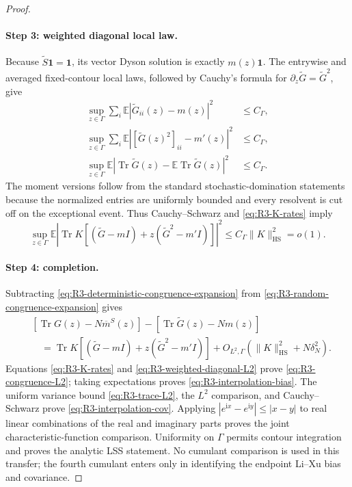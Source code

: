 \documentclass[10pt,a4paper]{amsart}
\newcommand{\E}{\mathbb E}
\newcommand{\Tr}{\operatorname{Tr}}
\newcommand{\ii}{\mathrm i}
\newcommand{\HS}{\mathrm{HS}}
\newcommand{\one}{\mathbf 1}
\newcommand{\norm}[1]{\lVert #1\rVert}
\begin{document}
\begin{proof}
\paragraph{Step 3: weighted diagonal local law.}
Because \(\widetilde S\one=\one\), its vector Dyson solution is exactly
\(m(z)\one\).  The entrywise and averaged fixed-contour local laws, followed
by Cauchy's formula for \(\partial_z\widetilde G=\widetilde G^2\), give
\begin{align}
 \sup_{z\in\Gamma}\sum_i
 \E|\widetilde G_{ii}(z)-m(z)|^2&\le C_\Gamma,
 \label{eq:R3-diagonal-L2-G}\\
 \sup_{z\in\Gamma}\sum_i
 \E|[\widetilde G(z)^2]_{ii}-m'(z)|^2&\le C_\Gamma,
 \label{eq:R3-diagonal-L2-G2}\\
 \sup_{z\in\Gamma}\E|\Tr\widetilde G(z)
 -\E\Tr\widetilde G(z)|^2&\le C_\Gamma.
 \label{eq:R3-trace-L2}
\end{align}
The moment versions follow from the standard stochastic-domination statements
because the normalized entries are uniformly bounded and every resolvent is
cut off on the exceptional event.  Thus Cauchy--Schwarz and
\eqref{eq:R3-K-rates} imply
\begin{equation}\label{eq:R3-weighted-diagonal-L2}
 \sup_{z\in\Gamma}\E\left|
 \Tr K\left[(\widetilde G-mI)
 +z(\widetilde G^2-m'I)\right]\right|^2
 \le C_\Gamma\norm{K}_{\HS}^2=o(1).
\end{equation}

\paragraph{Step 4: completion.}
Subtracting \eqref{eq:R3-deterministic-congruence-expansion} from
\eqref{eq:R3-random-congruence-expansion} gives
\begin{align}
 &\left[\Tr G(z)-N\overline m^S(z)\right]
 -\left[\Tr\widetilde G(z)-Nm(z)\right]\nonumber\\
 &\quad=\Tr K\left[(\widetilde G-mI)
 +z(\widetilde G^2-m'I)\right]
 +O_{L^2,\Gamma}(\norm{K}_{\HS}^2+N\delta_N^2).
 \label{eq:R3-master-congruence-transfer}
\end{align}
Equations \eqref{eq:R3-K-rates} and
\eqref{eq:R3-weighted-diagonal-L2} prove
\eqref{eq:R3-congruence-L2}; taking expectations proves
\eqref{eq:R3-interpolation-bias}.  The uniform variance bound
\eqref{eq:R3-trace-L2}, the \(L^2\) comparison, and Cauchy--Schwarz prove
\eqref{eq:R3-interpolation-cov}.  Applying
$|e^{\ii x}-e^{\ii y}|\le|x-y|$ to real linear combinations of the real and
imaginary parts proves the joint characteristic-function comparison.
Uniformity on \(\Gamma\) permits contour integration and proves the analytic
LSS statement.  No cumulant comparison is used in this transfer; the fourth
cumulant enters only in identifying the endpoint Li--Xu bias and covariance.
\end{proof}
\end{document}
